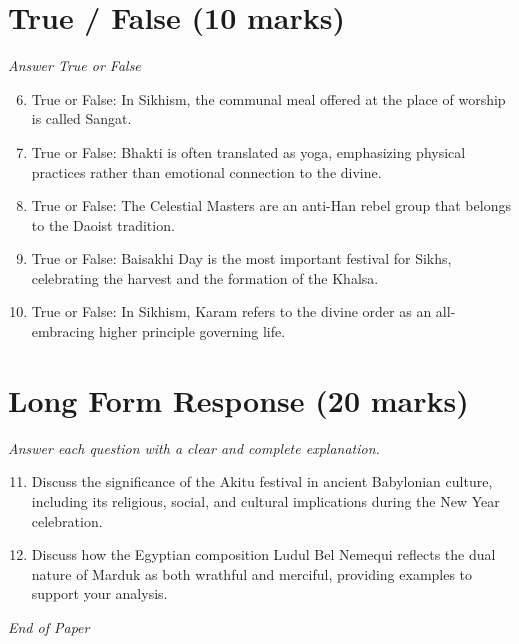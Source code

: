 \documentclass[12pt]{article}
\begin{document}
\section*{True / False (10 marks)}
\textit{Answer True or False}
\begin{enumerate}[label=\arabic*.]
\setcounter{enumi}{5}
\item True or False: In Sikhism, the communal meal offered at the place of worship is called Sangat.
\item True or False: Bhakti is often translated as yoga, emphasizing physical practices rather than emotional connection to the divine.
\item True or False: The Celestial Masters are an anti-Han rebel group that belongs to the Daoist tradition.
\item True or False: Baisakhi Day is the most important festival for Sikhs, celebrating the harvest and the formation of the Khalsa.
\item True or False: In Sikhism, Karam refers to the divine order as an all-embracing higher principle governing life.
\end{enumerate}

\section*{Long Form Response (20 marks)}
\textit{Answer each question with a clear and complete explanation.}
\begin{enumerate}[label=\arabic*.]
\setcounter{enumi}{10}
\item Discuss the significance of the Akitu festival in ancient Babylonian culture, including
its religious, social, and cultural implications during the New Year celebration.
\item Discuss how the Egyptian composition Ludul Bel Nemequi reflects the dual nature of Marduk
as both wrathful and merciful, providing examples to support your analysis.
\end{enumerate}

\vfill
\noindent\textit{End of Paper}
\end{document}
